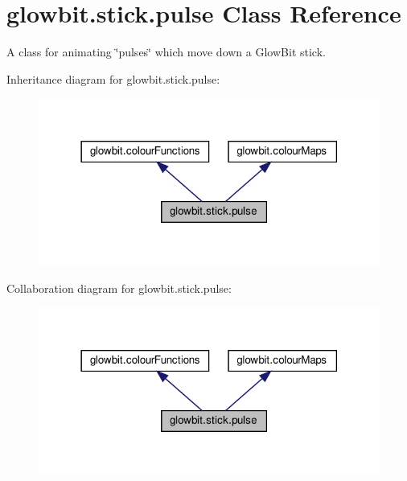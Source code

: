 \hypertarget{classglowbit_1_1stick_1_1pulse}{}\section{glowbit.\+stick.\+pulse Class Reference}
\label{classglowbit_1_1stick_1_1pulse}


A class for animating \char`\"{}pulses\char`\"{} which move down a Glow\+Bit stick.  




Inheritance diagram for glowbit.\+stick.\+pulse\+:\nopagebreak
\begin{figure}[H]
\begin{center}
\leavevmode
\includegraphics[width=318pt]{classglowbit_1_1stick_1_1pulse__inherit__graph}
\end{center}
\end{figure}


Collaboration diagram for glowbit.\+stick.\+pulse\+:\nopagebreak
\begin{figure}[H]
\begin{center}
\leavevmode
\includegraphics[width=318pt]{classglowbit_1_1stick_1_1pulse__coll__graph}
\end{center}
\end{figure}
